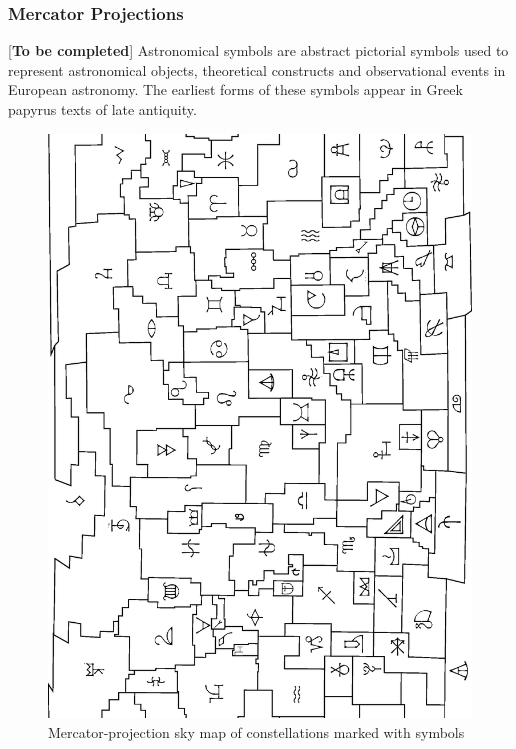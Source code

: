 \documentclass[a4paper,12pt]{extarticle}
\begin{document}
\subsubsection{Mercator Projections}
[\textbf{To be completed}] Astronomical symbols are abstract pictorial symbols used to represent astronomical objects, theoretical constructs and observational events in European astronomy. The earliest forms of these symbols appear in Greek papyrus texts of late antiquity.
\begin{figure}[H]
	\centering
	\includegraphics[width=0.8\linewidth]{starmap-glyph.png}
	\caption{Mercator-projection sky map of constellations marked with symbols}
\end{figure}
\end{document}
